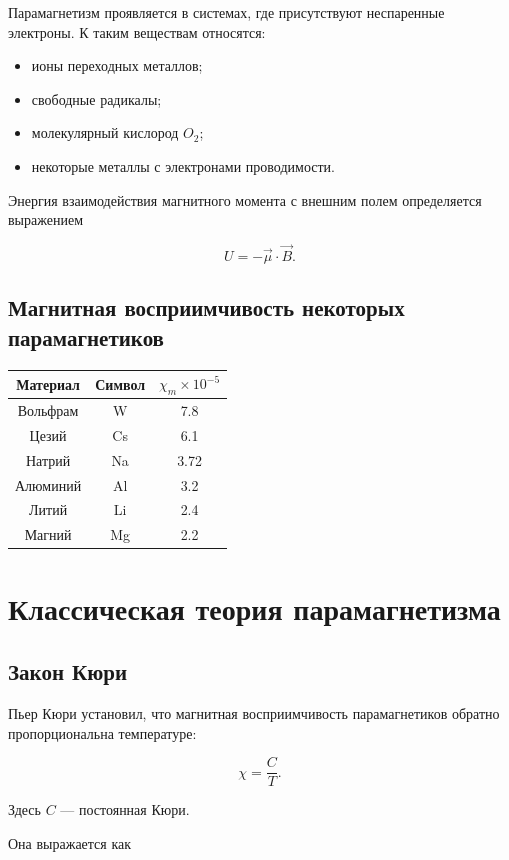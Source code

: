 \documentclass[a4paper,14pt]{extarticle}
\begin{document}
Парамагнетизм проявляется в системах, где присутствуют неспаренные электроны. К таким веществам относятся:

\begin{itemize}
\item ионы переходных металлов;
\item свободные радикалы;
\item молекулярный кислород $O_2$;
\item некоторые металлы с электронами проводимости.
\end{itemize}

Энергия взаимодействия магнитного момента с внешним полем определяется выражением

\[
U = -\vec{\mu}\cdot\vec{B}.
\]

\subsection*{Магнитная восприимчивость некоторых парамагнетиков}

\begin{center}
\begin{tabular}{|c|c|c|}
\hline
Материал & Символ & $\chi_m \times 10^{-5}$ \\
\hline
Вольфрам & W & 7.8 \\
Цезий & Cs & 6.1 \\
Натрий & Na & 3.72 \\
Алюминий & Al & 3.2 \\
Литий & Li & 2.4 \\
Магний & Mg & 2.2 \\
\hline
\end{tabular}
\end{center}

\section{Классическая теория парамагнетизма}

\subsection{Закон Кюри}

Пьер Кюри установил, что магнитная восприимчивость парамагнетиков обратно пропорциональна температуре:

\[
\chi = \frac{C}{T}.
\]

Здесь $C$ — постоянная Кюри.

Она выражается как
\end{document}
